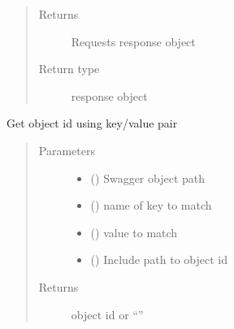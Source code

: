 \documentclass[letterpaper,10pt,english]{sphinxmanual}
\begin{document}
\begin{fulllineitems}
\begin{fulllineitems}
\begin{quote}
\begin{description}
\item[{Returns}] \leavevmode
\sphinxAtStartPar
Requests response object

\item[{Return type}] \leavevmode
\sphinxAtStartPar
response object

\end{description}\end{quote}

\end{fulllineitems}


\begin{fulllineitems}
\label{\detokenize{b1cdc-class:bloxone.b1cdc.get_id}}
\sphinxAtStartPar
Get object id using key/value pair
\begin{quote}\begin{description}
\item[{Parameters}] \leavevmode\begin{itemize}
\item {} 
\sphinxAtStartPar
{} () \textendash{} Swagger object path

\item {} 
\sphinxAtStartPar
{} () \textendash{} name of key to match

\item {} 
\sphinxAtStartPar
{} () \textendash{} value to match

\item {} 
\sphinxAtStartPar
{} () \textendash{} Include path to object id

\end{itemize}

\item[{Returns}] \leavevmode
\sphinxAtStartPar
object id or “”


\end{description}
\end{quote}
\end{fulllineitems}
\end{fulllineitems}
\end{document}
